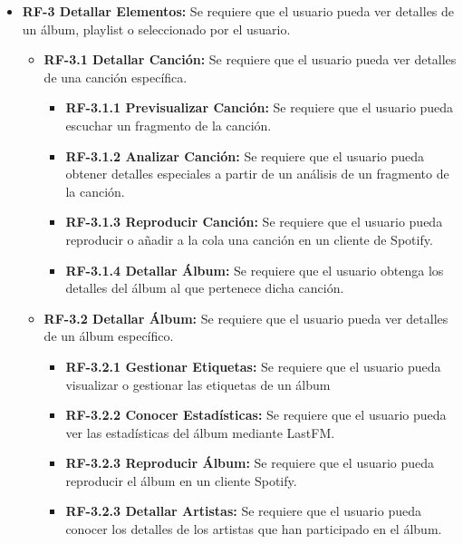 \begin{itemize}
    \item
        \textbf{RF-3 Detallar Elementos:} Se requiere que el usuario pueda ver detalles de un álbum, playlist o seleccionado por el usuario.
            \begin{itemize}
                \item 
                \textbf{RF-3.1 Detallar Canción:} Se requiere que el usuario pueda ver detalles de una canción específica.
                    \begin{itemize}
                        \item 
                            \textbf{RF-3.1.1 Previsualizar Canción:} Se requiere que el usuario pueda escuchar un fragmento de la canción.
                        \item
                            \textbf{RF-3.1.2 Analizar Canción:} Se requiere que el usuario pueda obtener detalles especiales a partir de un análisis de un fragmento de la canción.
                        \item
                            \textbf{RF-3.1.3 Reproducir Canción:} Se requiere que el usuario pueda reproducir o añadir a la cola una canción en un cliente de Spotify.
                        \item
                            \textbf{RF-3.1.4 Detallar Álbum:} Se requiere que el usuario obtenga los detalles del álbum al que pertenece dicha canción.

                    \end{itemize}
                    
                \item 
                \textbf{RF-3.2 Detallar Álbum:} Se requiere que el usuario pueda ver detalles de un álbum específico.
                    \begin{itemize}
                        \item 
                            \textbf{RF-3.2.1 Gestionar Etiquetas:} Se requiere que el usuario pueda visualizar o gestionar las etiquetas de un álbum
                        \item 
                            \textbf{RF-3.2.2 Conocer Estadísticas:} Se requiere que el usuario pueda ver las estadísticas del álbum mediante LastFM.
                        \item 
                            \textbf{RF-3.2.3 Reproducir Álbum:} Se requiere que el usuario pueda reproducir el álbum en un cliente Spotify.                 
                        \item 
                            \textbf{RF-3.2.3 Detallar Artistas:} Se requiere que el usuario pueda conocer los detalles de los artistas que han participado en el álbum.
                    \end{itemize}
                

\end{itemize}
\end{itemize}

